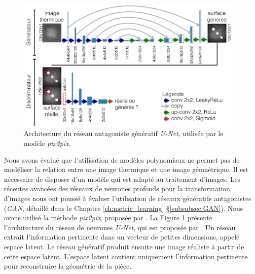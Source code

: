 \begin{figure}[bthp]
	\centering
	\includegraphics[width=\textwidth]{../Chap2/Figures/U-Net-architecture-JDD2018.pdf}
	\caption{Architecture du réseau antagoniste génératif \textit{U-Net}, utilisée par le modèle \textit{pix2pix}.}
	\label{fig:pix2pix}
\end{figure}

Nous avons évalué que l'utilisation de modèles polynomiaux ne permet pas de modéliser la relation entre une image thermique et une image géométrique.
Il est nécessaire de disposer d'un modèle qui est adapté au traitement d'images.
Les récentes avancées des réseaux de neurones profonds pour la transformation d'images nous ont poussé à évaluer l'utilisation de réseaux génératifs antagonistes (\textit{GAN}, détaillé dans le Chapitre \ref{ch:metric_learning} §\ref{subsubsec:GAN}).
Nous avons utilisé la méthode \textit{pix2pix}, proposée par \citeauthor{zhu_unpaired_2017} \cite{zhu_unpaired_2017}.
La Figure \ref{fig:pix2pix} présente l'architecture du réseau de neurones \textit{U-Net}, qui est proposée par \citeauthor{ronneberger_unet_2015} \cite{ronneberger_unet_2015}.
Un réseau extrait l'information pertinente dans un vecteur de petites dimensions, appelé espace latent.
Le réseau génératif produit ensuite une image réaliste à partir de cette espace latent.
L'espace latent contient uniquement l'information pertinente pour reconstruire la géométrie de la pièce.

